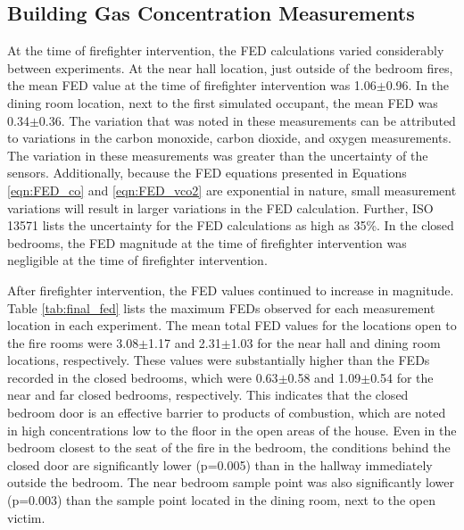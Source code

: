 \documentclass[12pt,oneside]{article}
\begin{document}
\subsection{Building Gas Concentration Measurements}
\label{subsec:gas}
At the time of firefighter intervention, the FED calculations varied considerably between experiments. At the near hall location, just outside of the bedroom fires,  the mean FED value at the time of firefighter intervention was 1.06$\pm$0.96. In the dining room location, next to the first simulated occupant, the mean FED was 0.34$\pm$0.36. The variation that was noted in these measurements can be attributed to variations in the carbon monoxide, carbon dioxide, and oxygen measurements. The variation in these measurements was greater than the uncertainty of the sensors. Additionally, because the FED equations presented in Equations \ref{eqn:FED_co} and \ref{eqn:FED_vco2} are exponential in nature, small measurement variations will result in larger variations in the FED calculation. Further, ISO 13571 \cite{ISO13571} lists the uncertainty for the FED calculations as high as 35\%. In the closed bedrooms, the FED magnitude at the time of firefighter intervention was negligible at the time of firefighter intervention. 

After firefighter intervention, the FED values continued to increase in magnitude. Table \ref{tab:final_fed} lists the maximum FEDs observed for each measurement location in each experiment. The mean total FED values for the  locations open to the fire rooms were 3.08$\pm$1.17 and 2.31$\pm$1.03 for the near hall and dining room locations, respectively. These values were substantially higher than the FEDs recorded in the closed bedrooms, which were 0.63$\pm$0.58 and 1.09$\pm$0.54 for the near and far closed bedrooms, respectively. This indicates that the closed bedroom door is an effective barrier to products of combustion, which are noted in high concentrations low to the floor in the open areas of the house. Even in the bedroom closest to the seat of the fire in the bedroom, the conditions behind the closed door are significantly lower (p=0.005) than in the hallway immediately outside the bedroom. The near bedroom sample point was also significantly lower (p=0.003) than the sample point located in the dining room, next to the open victim.
\end{document}
